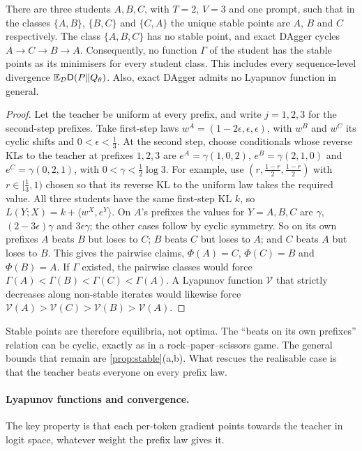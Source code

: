 \begin{proposition}\label{prop:rps}
\Pv\Ck There are three students $A,B,C$, with $T=2$, $V=3$ and one prompt, such that in the classes $\{A,B\}$,
$\{B,C\}$ and $\{C,A\}$ the unique stable points are $A$, $B$ and $C$ respectively. The class $\{A,B,C\}$ has no stable point, and
exact DAgger cycles $A\to C\to B\to A$. Consequently, no function $\Gamma$ of the student has the stable points as its minimisers for
every student class. This includes every sequence-level divergence $\mathbb{E}_{\mathcal{D}}\mathsf D(P\|Q_\theta)$. Also, exact DAgger admits no Lyapunov
function in general.
\end{proposition}
\begin{proof}
Let the teacher be uniform at every prefix, and write $j=1,2,3$ for the second-step prefixes. Take
first-step laws $w^A=(1-2\epsilon,\epsilon,\epsilon)$, with $w^B$ and $w^C$ its cyclic shifts and $0<\epsilon<\frac13$. At the second step, choose
conditionals whose reverse KLs to the teacher at prefixes $1,2,3$ are $e^A=\gamma(1,0,2)$, $e^B=\gamma(2,1,0)$ and $e^C=\gamma(0,2,1)$, with
$0<\gamma<\frac12\log3$. For example, use $(r,\frac{1-r}2,\frac{1-r}2)$ with $r\in[\frac13,1)$ chosen so that its reverse KL to the uniform law takes the required value. All three students have the same
first-step KL $k$, so $L(Y;X)=k+\langle w^X,e^Y\rangle$. On $A$'s prefixes the values for $Y=A,B,C$ are $\gamma$, $(2-3\epsilon)\gamma$ and $3\epsilon\gamma$;
the other cases follow by cyclic symmetry. So on its own prefixes $A$ beats $B$ but loses to $C$; $B$ beats $C$ but loses
to $A$; and $C$ beats $A$ but loses to $B$. This gives the pairwise claims, $\Phi(A)=C$, $\Phi(C)=B$ and $\Phi(B)=A$. If $\Gamma$ existed, the
pairwise classes would force $\Gamma(A)<\Gamma(B)<\Gamma(C)<\Gamma(A)$. A Lyapunov function $\mathcal V$ that strictly decreases along non-stable
iterates would likewise force $\mathcal V(A)>\mathcal V(C)>\mathcal V(B)>\mathcal V(A)$.
\end{proof}
\noindent
Stable points are therefore equilibria, not optima. The ``beats on its own prefixes'' relation can be cyclic,
exactly as in a rock--paper--scissors game. The general bounds that remain are \cref{prop:stable}(a,b). What rescues the
realisable case is that the teacher beats everyone on every prefix law.

\paragraph{Lyapunov functions and convergence.} The key property is that each per-token gradient points
towards the teacher in logit space, whatever weight the prefix law gives it.

